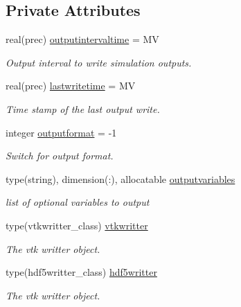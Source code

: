 \subsection*{Private Attributes}
\begin{DoxyCompactItemize}
\item 
real(prec) \mbox{\hyperlink{structsimulationoutputstreamer__mod_1_1output__streamer__class_aacf7688bfe4a91af5a8db9e7003a041b}{outputintervaltime}} = MV
\begin{DoxyCompactList}\small\item\em Output interval to write simulation outputs. \end{DoxyCompactList}\item 
real(prec) \mbox{\hyperlink{structsimulationoutputstreamer__mod_1_1output__streamer__class_a9ea996af0c9a2d9f3930092e83ca71bb}{lastwritetime}} = MV
\begin{DoxyCompactList}\small\item\em Time stamp of the last output write. \end{DoxyCompactList}\item 
integer \mbox{\hyperlink{structsimulationoutputstreamer__mod_1_1output__streamer__class_a53a4af6464bb24e7191a7632fb3b4f38}{outputformat}} = -\/1
\begin{DoxyCompactList}\small\item\em Switch for output format. \end{DoxyCompactList}\item 
type(string), dimension(\+:), allocatable \mbox{\hyperlink{structsimulationoutputstreamer__mod_1_1output__streamer__class_ac40e7c8fba522050b23a70dc6da590a3}{outputvariables}}
\begin{DoxyCompactList}\small\item\em list of optional variables to output \end{DoxyCompactList}\item 
type(vtkwritter\+\_\+class) \mbox{\hyperlink{structsimulationoutputstreamer__mod_1_1output__streamer__class_a883916a5ede4ceff754115bd3317649e}{vtkwritter}}
\begin{DoxyCompactList}\small\item\em The vtk writter object. \end{DoxyCompactList}\item 
type(hdf5writter\+\_\+class) \mbox{\hyperlink{structsimulationoutputstreamer__mod_1_1output__streamer__class_ac91899fff60f6ddcb234cfc4efb471b2}{hdf5writter}}
\begin{DoxyCompactList}\small\item\em The vtk writter object. \end{DoxyCompactList}\end{DoxyCompactItemize}


